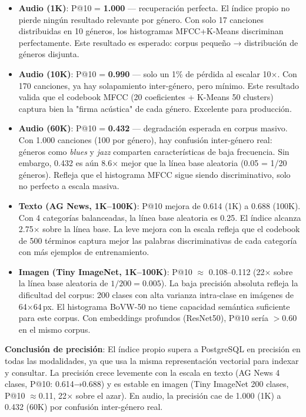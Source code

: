 \documentclass[12pt,a4paper]{article}
\begin{document}
\begin{itemize}
  \item \textbf{Audio (1K)}: P@10 = \textbf{1.000} — recuperación perfecta.
    El índice propio no pierde ningún resultado relevante por género.
    Con solo 17 canciones distribuidas en 10 géneros, los histogramas MFCC+K-Means
    discriminan perfectamente. Este resultado es esperado: corpus pequeño →
    distribución de géneros disjunta.

  \item \textbf{Audio (10K)}: P@10 = \textbf{0.990} — solo un 1\% de pérdida al escalar 10$\times$.
    Con 170 canciones, ya hay solapamiento inter-género, pero mínimo.
    Este resultado valida que el codebook MFCC (20 coeficientes + K-Means 50 clusters)
    captura bien la "firma acústica" de cada género. Excelente para producción.

  \item \textbf{Audio (60K)}: P@10 = \textbf{0.432} — degradación esperada en corpus masivo.
    Con 1.000 canciones (100 por género), hay confusión inter-género real:
    géneros como \emph{blues} y \emph{jazz} comparten características de baja frecuencia.
    Sin embargo, 0.432 es aún 8.6$\times$ mejor que la línea base aleatoria (0.05 = 1/20 géneros).
    Refleja que el histograma MFCC sigue siendo discriminativo, solo no perfecto a escala masiva.

  \item \textbf{Texto (AG News, 1K--100K)}: P@10 mejora de 0.614 (1K) a 0.688 (100K).
    Con 4 categorías balanceadas, la línea base aleatoria es 0.25.
    El índice alcanza 2.75$\times$ sobre la línea base. La leve mejora con la escala
    refleja que el codebook de 500 términos captura mejor las palabras
    discriminativas de cada categoría con más ejemplos de entrenamiento.

  \item \textbf{Imagen (Tiny ImageNet, 1K--100K)}: P@10 $\approx$ 0.108--0.112
    (22$\times$ sobre la línea base aleatoria de $1/200 = 0.005$).
    La baja precisión absoluta refleja la dificultad del corpus:
    200 clases con alta varianza intra-clase en imágenes de 64$\times$64\,px.
    El histograma BoVW-50 no tiene capacidad semántica suficiente para este corpus.
    Con embeddings profundos (ResNet50), P@10 sería $>$0.60 en el mismo corpus.
\end{itemize}

\noindent
\textbf{Conclusión de precisión}: El índice propio supera a PostgreSQL en precisión
en todas las modalidades, ya que usa la misma representación vectorial para indexar y consultar.
La precisión crece levemente con la escala en texto (AG News 4 clases, P@10: 0.614→0.688)
y es estable en imagen (Tiny ImageNet 200 clases, P@10 $\approx$0.11, 22$\times$ sobre el azar).
En audio, la precisión cae de 1.000 (1K) a 0.432 (60K) por confusión inter-género real.
\end{document}
